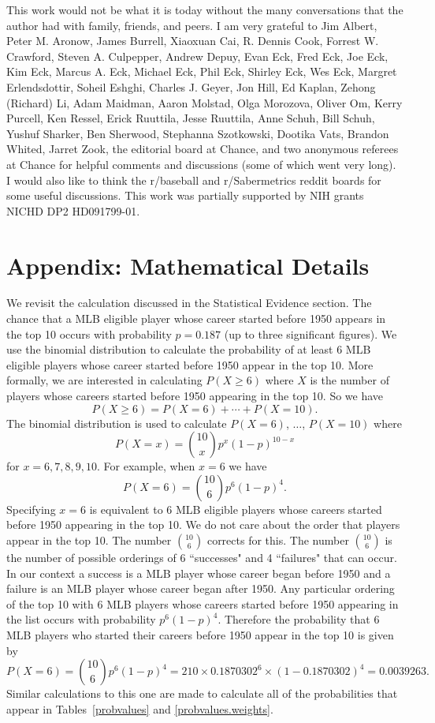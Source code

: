 \documentclass[11pt]{article}\usepackage[]{graphicx}\usepackage[]{color}
\begin{document}
This work would not be what it is today without the many conversations that 
the author had with family, friends, and peers.
I am very grateful to 
Jim Albert, 
Peter M. Aronow, 
James Burrell, 
Xiaoxuan Cai, 
R. Dennis Cook, 
Forrest W. Crawford, 
Steven A. Culpepper, 
Andrew Depuy, 
Evan Eck, 
Fred Eck, 
Joe Eck,
Kim Eck, 
Marcus A. Eck, 
Michael Eck, 
Phil Eck, 
Shirley Eck, 
Wes Eck, 
Margret Erlendsdottir, 
Soheil Eshghi, 
Charles J. Geyer, 
Jon Hill,
Ed Kaplan, 
Zehong (Richard) Li, 
Adam Maidman, 
Aaron Molstad, 
Olga Morozova, 
Oliver Om, 
Kerry Purcell, 
Ken Ressel, 
Erick Ruuttila, 
Jesse Ruuttila, 
Anne Schuh, 
Bill Schuh, 
Yushuf Sharker, 
Ben Sherwood, 
Stephanna Szotkowski,
Dootika Vats,
Brandon Whited,
Jarret Zook,
the editorial board at Chance, 
and 
two anonymous referees at Chance
for helpful comments and discussions (some of which went very long).  
I would also like to think the r/baseball and r/Sabermetrics reddit boards 
for some useful discussions.  
This work was partially supported by NIH grants NICHD DP2 HD091799-01.




\section*{Appendix: Mathematical Details}

We revisit the calculation discussed in the Statistical Evidence section.  
The chance that a MLB eligible player whose career started before 1950 
appears in the top 10 occurs with probability $p = 0.187$ 
(up to three significant figures).  We use the binomial distribution to 
calculate the probability of at least 6 MLB eligible players whose career 
started before 1950 appear in the top 10.  More formally, we are interested in 
calculating $P(X \geq 6)$ where $X$ is the number of players whose careers 
started before 1950 appearing in the top 10.  So we have
$$  
  P(X \geq 6) = P(X = 6) + \cdots + P(X = 10). 
$$
The binomial distribution is used to calculate $P(X = 6)$, $\ldots$, 
$P(X = 10)$ where
$$  
  P(X = x) = {10 \choose x}p^x(1-p)^{10-x}
$$
for $x = 6,7,8,9,10$. For example, when $x = 6$ we have
$$  
  P(X = 6) = {10 \choose 6}p^6(1-p)^{4}. 
$$
Specifying $x = 6$ is equivalent to 6 MLB eligible players whose careers 
started before 1950 appearing in the top 10.  We do not care about the order 
that players appear in the top 10.  The number ${10 \choose 6}$ corrects for 
this. The number ${10 \choose 6}$ is the number of possible orderings of 6 
``successes" and 4 ``failures" that can occur.  In our context a success is a 
MLB player whose career began before 1950 and a failure is an 
MLB player whose career began after 1950.  Any particular ordering of the top 
10 with 6 MLB players whose careers started before 1950 appearing 
in the list occurs with probability $p^6(1-p)^4$. 
Therefore the probability that 6 MLB players who started their careers  
before 1950 appear in the top 10 is given by
$$  
  P(X = 6) = {10 \choose 6}p^6(1-p)^{4} 
    = 210 \times 0.1870302^6 \times (1 - 0.1870302)^4
    = 0.0039263. 
$$
Similar calculations to this one are made to calculate all of the 
probabilities that appear in Tables~\ref{probvalues} and 
\ref{probvalues.weights}.
\end{document}
